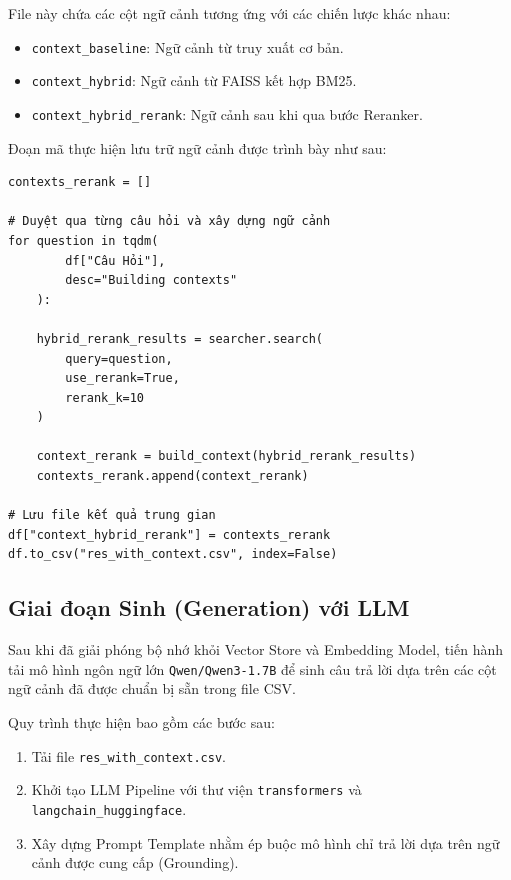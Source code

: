 File này chứa các cột ngữ cảnh tương ứng với các chiến lược khác nhau:
 
\begin{itemize}
    \item \texttt{context\_baseline}: Ngữ cảnh từ truy xuất cơ bản.
    \item \texttt{context\_hybrid}: Ngữ cảnh từ FAISS kết hợp BM25.
    \item \texttt{context\_hybrid\_rerank}: Ngữ cảnh sau khi qua bước Reranker.
\end{itemize}
 
Đoạn mã thực hiện lưu trữ ngữ cảnh được trình bày như sau:
 
\begin{verbatim}
contexts_rerank = []
 
# Duyệt qua từng câu hỏi và xây dựng ngữ cảnh
for question in tqdm(
        df["Câu Hỏi"],
        desc="Building contexts"
    ):
 
    hybrid_rerank_results = searcher.search(
        query=question,
        use_rerank=True,
        rerank_k=10
    )
 
    context_rerank = build_context(hybrid_rerank_results)
    contexts_rerank.append(context_rerank)
 
# Lưu file kết quả trung gian
df["context_hybrid_rerank"] = contexts_rerank
df.to_csv("res_with_context.csv", index=False)
\end{verbatim}

\subsection{Giai đoạn Sinh (Generation) với LLM}
 
Sau khi đã giải phóng bộ nhớ khỏi Vector Store và Embedding Model, tiến hành tải mô hình
ngôn ngữ lớn \texttt{Qwen/Qwen3-1.7B} để sinh câu trả lời dựa trên các cột ngữ cảnh đã được chuẩn bị
sẵn trong file CSV.
 
Quy trình thực hiện bao gồm các bước sau:
 
\begin{enumerate}
    \item Tải file \texttt{res\_with\_context.csv}.
    \item Khởi tạo LLM Pipeline với thư viện \texttt{transformers} và \texttt{langchain\_huggingface}.
    \item Xây dựng Prompt Template nhằm ép buộc mô hình chỉ trả lời dựa trên ngữ cảnh được
    cung cấp (Grounding).
\end{enumerate}
 
